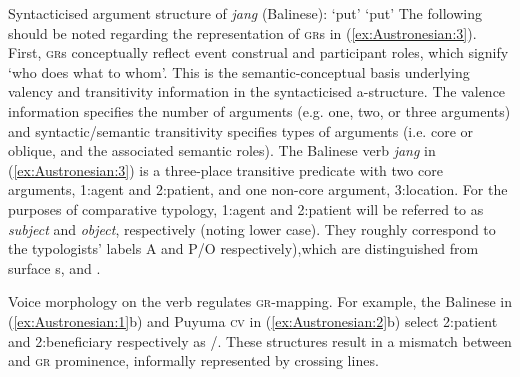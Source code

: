 \documentclass[output=paper,chinesefont]{../langscibook}
\begin{document}
\ea\label{ex:Austronesian:3} Syntacticised argument structure of \emph{jang} (Balinese):
\ea `put'
\ex `put'
\z\z
The following should be noted regarding the representation of \textsc{gr}s in (\ref{ex:Austronesian:3}). First, \textsc{gr}s conceptually reflect event construal and participant roles, which signify `who does what to whom'. This is the semantic-conceptual basis underlying valency and transitivity information in the syntacticised a-structure. The valence information specifies the number of arguments (e.g. one, two, or three arguments) and syntactic/semantic transitivity specifies types of arguments (i.e. core or oblique, and the associated semantic roles). The Balinese verb \emph{jang} in (\ref{ex:Austronesian:3}) is a three-place transitive predicate with two core arguments, 1:agent and 2:patient, and one non-core argument, 3:location. For the purposes of comparative typology, 1:agent and 2:patient will be referred to as \emph{subject} and \emph{object}, respectively (noting lower case). They roughly correspond to the typologists' labels A and \mbox{P/O} respectively),which are distinguished from surface {\GF}s, \SUBJ and \OBJ.

Voice morphology on the verb regulates \textsc{gr}-\GF mapping. For example, the Balinese \UV in (\ref{ex:Austronesian:1}b) and Puyuma \textsc{cv} in (\ref{ex:Austronesian:2}b) select 2:patient and 2:beneficiary respectively as \SUBJ/\PIVOT. These \UV structures result in a mismatch between \GF and \textsc{gr} prominence, informally represented by crossing lines.
\end{document}
